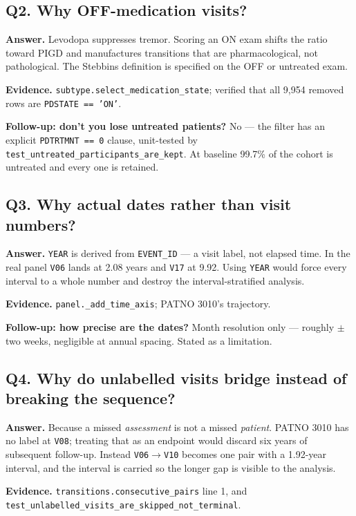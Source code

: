 \documentclass[11pt,a4paper]{article}
\newcommand{\code}[1]{\texttt{\small #1}}
\newcommand{\arr}{$\rightarrow$}
\begin{document}
\subsection*{Q2. Why OFF-medication visits?}
\textbf{Answer.} Levodopa suppresses tremor. Scoring an ON exam shifts the
ratio toward PIGD and manufactures transitions that are pharmacological, not
pathological. The Stebbins definition is specified on the OFF or untreated exam.

\textbf{Evidence.} \code{subtype.select\_medication\_state}; verified that all
9{,}954 removed rows are \code{PDSTATE == 'ON'}.

\textbf{Follow-up: don't you lose untreated patients?} No --- the filter has an
explicit \code{PDTRTMNT == 0} clause, unit-tested by
\code{test\_untreated\_participants\_are\_kept}. At baseline 99.7\% of the
cohort is untreated and every one is retained.

\subsection*{Q3. Why actual dates rather than visit numbers?}
\textbf{Answer.} \code{YEAR} is derived from \code{EVENT\_ID} --- a visit label,
not elapsed time. In the real panel \code{V06} lands at 2.08 years and
\code{V17} at 9.92. Using \code{YEAR} would force every interval to a whole
number and destroy the interval-stratified analysis.

\textbf{Evidence.} \code{panel.\_add\_time\_axis}; PATNO 3010's trajectory.

\textbf{Follow-up: how precise are the dates?} Month resolution only ---
roughly $\pm$ two weeks, negligible at annual spacing. Stated as a limitation.

\subsection*{Q4. Why do unlabelled visits bridge instead of breaking the sequence?}
\textbf{Answer.} Because a missed \emph{assessment} is not a missed
\emph{patient}. PATNO 3010 has no label at \code{V08}; treating that as an
endpoint would discard six years of subsequent follow-up. Instead
\code{V06}\arr\code{V10} becomes one pair with a 1.92-year interval, and the
interval is carried so the longer gap is visible to the analysis.

\textbf{Evidence.} \code{transitions.consecutive\_pairs} line 1, and
\code{test\_unlabelled\_visits\_are\_skipped\_not\_terminal}.
\end{document}
